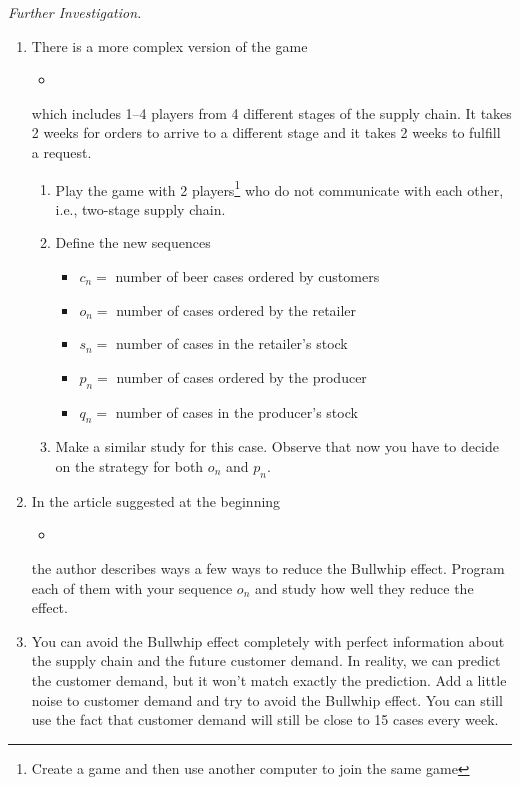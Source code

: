 \emph{Further Investigation. } 
\begin{enumerate}[label=\emph{\arabic*.}]
\item There is a more complex version of the game 
\begin{graybox}
\begin{itemize}
	\item {}
\end{itemize}
\end{graybox}
which includes 1--4 players from 4 different stages of the supply chain. It takes 2 weeks for orders to arrive to a different stage and it takes 2 weeks to fulfill a request.

\begin{enumerate}[label = \emph{(\alph*)}]
\item Play the game with 2 players\footnote{Create a game and then use another computer to join the same game} who do not communicate with each other, i.e., two-stage supply chain.

\item Define the new sequences
\begin{itemize}
\item $c_n = $ number of beer cases ordered by customers
\item $o_n = $ number of cases ordered by the retailer
\item $s_n = $ number of cases in the retailer's stock
\item $p_n = $ number of cases ordered by the producer
\item $q_n = $ number of cases in the producer's stock
\end{itemize}

\item Make a similar study for this case. Observe that now you have to decide on the strategy for both $o_n$ and $p_n$.
\end{enumerate}


\item In the article suggested at the beginning
\begin{emphbox}[]
\begin{itemize}
\item {}
\end{itemize}
\end{emphbox}
the author describes ways a few ways to reduce the Bullwhip effect. Program each of them with your sequence $o_n$ and study how well they reduce the effect.


\item You can avoid the Bullwhip effect completely with perfect information about the supply chain and the future customer demand. In reality, we can predict the customer demand, but it won't match exactly the prediction. Add a little noise to customer demand and try to avoid the Bullwhip effect. You can still use the fact that customer demand will still be close to 15 cases every week.
\end{enumerate}

\begin{noexercises}
\end{noexercises}
